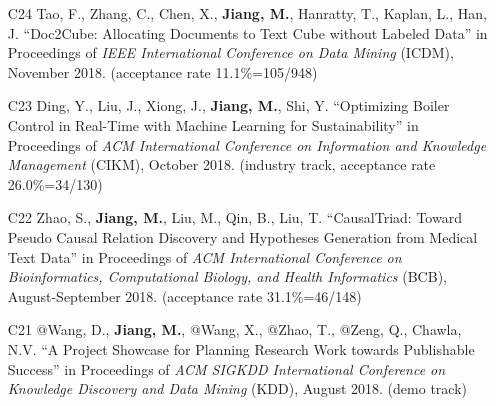 \documentclass[10pt]{article}
\newenvironment{myindentpar}[1]%
{\begin{list}{}%
         {\setlength{\leftmargin}{#1}}%
         \item[]%
}
{\end{list}}
\newcounter{list}
\newcommand{\hide}[1]{}
\begin{document}
\begin{myindentpar}{0.00cm}
\begin{enumerate}[leftmargin=.5cm]
	\hide{\vspace{-0.1cm}\hspace{0.5cm}{\small \emph{I made 40\% contribution and Mr. Zhao made 40\%. I conceived the idea and designed the study. Mr. Zhao implemented the system. Mr. Malir (sophomore) did the experiments. Mr. Zhao and I wrote the paper.}}}

\item[C24] Tao, F., Zhang, C., Chen, X., \textbf{Jiang, M.}, Hanratty, T., Kaplan, L., Han, J. ``Doc2Cube: Allocating Documents to Text Cube without Labeled Data'' in Proceedings of \emph{IEEE International Conference on Data Mining } (ICDM), November 2018. (acceptance rate 11.1\%=105/948)

	\hide{\vspace{-0.1cm}\hspace{0.5cm}{\small \emph{I made 3\% contribution. Mr. Tao conceived the idea in consultation with myself. Mr. Tao did the experiments and wrote the paper.}}}

\item[C23] Ding, Y., Liu, J., Xiong, J., \textbf{Jiang, M.}, Shi, Y. ``Optimizing Boiler Control in Real-Time with Machine Learning for Sustainability'' in Proceedings of \emph{ACM International Conference on Information and Knowledge Management} (CIKM), October 2018. (industry track, acceptance rate 26.0\%=34/130)

	\hide{\vspace{-0.1cm}\hspace{0.5cm}{\small \emph{I made 3\% contribution. Mr. Ding conceived the idea in consultation with myself. Mr. Ding implemented the system, completed the experiments, and wrote the paper.}}}

\item[C22] Zhao, S., \textbf{Jiang, M.}, Liu, M., Qin, B., Liu, T. ``CausalTriad: Toward Pseudo Causal Relation Discovery and Hypotheses Generation from Medical Text Data'' in Proceedings of \emph{ACM International Conference on Bioinformatics, Computational Biology, and Health Informatics} (BCB), August-September 2018. (acceptance rate 31.1\%=46/148)

	\hide{\vspace{-0.1cm}\hspace{0.5cm}{\small \emph{I made 20\% contribution. Mr. Zhao conceived the idea in consultation with myself. Mr. Zhao implemented the system, completed the experiments, and wrote the paper.}}}

\item[C21] @Wang, D., \textbf{Jiang, M.}, @Wang, X., @Zhao, T., @Zeng, Q., Chawla, N.V. ``A Project Showcase for Planning Research Work towards Publishable Success'' in Proceedings of \emph{ACM SIGKDD International Conference on Knowledge Discovery and Data Mining} (KDD), August 2018. (demo track)


\end{enumerate}
\end{myindentpar}
\end{document}
